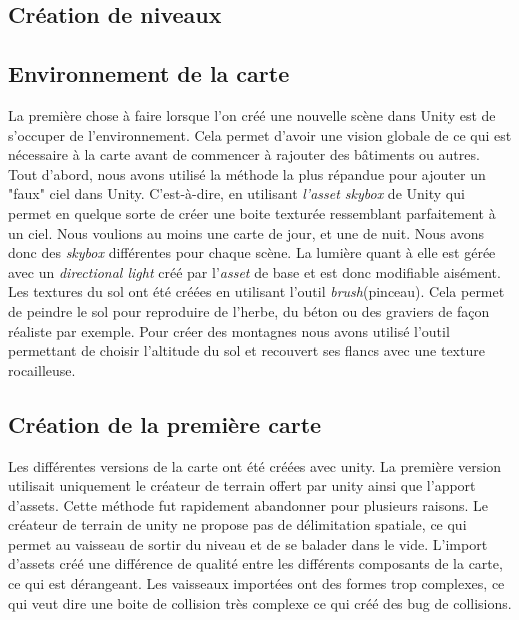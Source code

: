 \documentclass[12pt, titlepage]{article}
\begin{document}
\begin{spacing}{1.5}
\newpage
\section{Création de niveaux}

\subsection{Environnement de la carte}
La première chose à faire lorsque l’on créé une nouvelle scène dans Unity est de s’occuper de l’environnement. Cela permet d’avoir une vision globale de ce qui est nécessaire à la carte avant de commencer à rajouter des bâtiments ou autres.\\

Tout d’abord, nous avons utilisé la méthode la plus répandue pour ajouter un "faux" ciel dans Unity. C’est-à-dire, en utilisant \textit{l'asset skybox} de Unity qui permet en quelque sorte de créer une boite texturée ressemblant parfaitement à un ciel. Nous voulions au moins une carte de jour, et une de nuit. Nous avons donc des \textit{skybox} différentes pour chaque scène. La lumière quant à elle est gérée avec un \textit{directional light} créé par l'\textit{asset} de base et est donc modifiable aisément.\\

Les textures du sol ont été créées en utilisant l'outil \textit{brush}(pinceau). Cela permet de peindre le sol pour reproduire de l’herbe, du béton ou des graviers de façon réaliste par exemple. Pour créer des montagnes nous avons utilisé l’outil permettant de choisir l’altitude du sol et recouvert ses flancs avec une texture rocailleuse.\\

\subsection{Création de la première carte}

Les différentes versions de la carte ont été créées avec unity. La première version utilisait uniquement le créateur de terrain offert par unity ainsi que l'apport d'assets. Cette méthode fut rapidement abandonner pour plusieurs raisons. Le créateur de terrain de unity ne propose pas de délimitation spatiale, ce qui permet au vaisseau de sortir du niveau et de se balader dans le vide. L'import d'assets créé une différence de qualité entre les différents composants de la carte, ce qui est dérangeant. Les vaisseaux importées ont des formes trop complexes, ce qui veut dire une boite de collision très complexe ce qui créé des bug de collisions. \\


\end{spacing}
\end{document}
